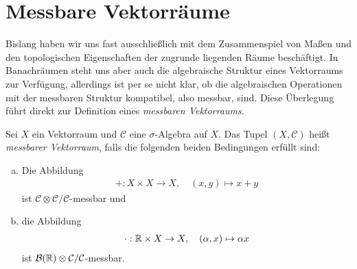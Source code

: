 \section{Messbare Vektorräume}
Bislang haben wir uns fast ausschließlich mit dem Zusammenspiel von Maßen und den topologischen Eigenschaften der zugrunde liegenden Räume beschäftigt.
In Banachräumen steht uns aber auch die algebraische Struktur eines Vektorraums zur Verfügung, allerdings ist per se nicht klar, ob die algebraischen Operationen mit der messbaren Struktur kompatibel, also messbar, sind. 
Diese Überlegung führt direkt zur Definition eines \textit{messbaren Vektorraums}. 

\begin{mydef}
    Sei $X$ ein Vektorraum und $\mathcal{C}$ eine $\sigma$-Algebra auf $X$. Das Tupel $(X, \mathcal{C})$ heißt \textit{messbarer Vektorraum}, falls die folgenden beiden Bedingungen erfüllt sind: 
    \begin{enumerate}[(a)]
        \item Die Abbildung 
        \begin{align*}
            + : X \times X \to X, \quad (x,y) \mapsto x + y
        \end{align*}
        ist $\mathcal{C}\otimes \mathcal{C}/\mathcal{C}$-messbar und
        \item die Abbildung 
        \begin{align*}
            \cdot : \mathbb{R} \times X \to X, \quad  (\alpha, x) \mapsto \alpha x
        \end{align*}
        ist $\mathcal{B}(\mathbb{R}) \otimes \mathcal{C}/\mathcal{C}$-messbar. 
    \end{enumerate}
\end{mydef}

